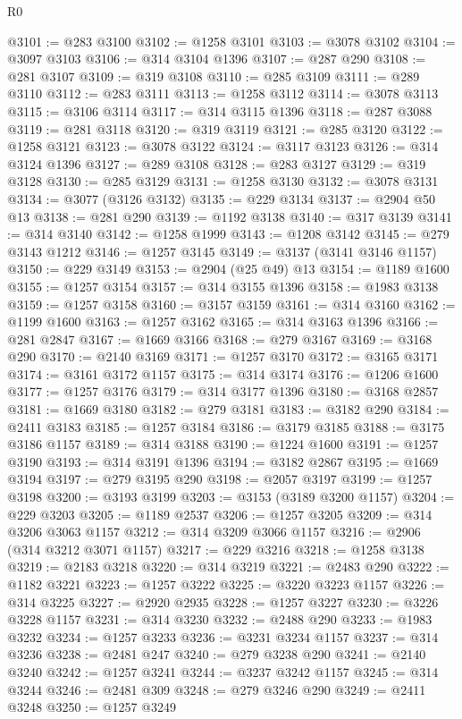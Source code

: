 \begin{lexlean}{R0}
\begin{coremodule}
@3101 := @283 @3100
@3102 := @1258 @3101
@3103 := @3078 @3102
@3104 := @3097 @3103
@3106 := @314 @3104 @1396
@3107 := @287 @290
@3108 := @281 @3107
@3109 := @319 @3108
@3110 := @285 @3109
@3111 := @289 @3110
@3112 := @283 @3111
@3113 := @1258 @3112
@3114 := @3078 @3113
@3115 := @3106 @3114
@3117 := @314 @3115 @1396
@3118 := @287 @3088
@3119 := @281 @3118
@3120 := @319 @3119
@3121 := @285 @3120
@3122 := @1258 @3121
@3123 := @3078 @3122
@3124 := @3117 @3123
@3126 := @314 @3124 @1396
@3127 := @289 @3108
@3128 := @283 @3127
@3129 := @319 @3128
@3130 := @285 @3129
@3131 := @1258 @3130
@3132 := @3078 @3131
@3134 := @3077 (@3126 @3132)
@3135 := @229 @3134
@3137 := @2904 @50 @13
@3138 := @281 @290
@3139 := @1192 @3138
@3140 := @317 @3139
@3141 := @314 @3140
@3142 := @1258 @1999
@3143 := @1208 @3142
@3145 := @279 @3143 @1212
@3146 := @1257 @3145
@3149 := @3137 (@3141 @3146 @1157)
@3150 := @229 @3149
@3153 := @2904 (@25 @49) @13
@3154 := @1189 @1600
@3155 := @1257 @3154
@3157 := @314 @3155 @1396
@3158 := @1983 @3138
@3159 := @1257 @3158
@3160 := @3157 @3159
@3161 := @314 @3160
@3162 := @1199 @1600
@3163 := @1257 @3162
@3165 := @314 @3163 @1396
@3166 := @281 @2847
@3167 := @1669 @3166
@3168 := @279 @3167
@3169 := @3168 @290
@3170 := @2140 @3169
@3171 := @1257 @3170
@3172 := @3165 @3171
@3174 := @3161 @3172 @1157
@3175 := @314 @3174
@3176 := @1206 @1600
@3177 := @1257 @3176
@3179 := @314 @3177 @1396
@3180 := @3168 @2857
@3181 := @1669 @3180
@3182 := @279 @3181
@3183 := @3182 @290
@3184 := @2411 @3183
@3185 := @1257 @3184
@3186 := @3179 @3185
@3188 := @3175 @3186 @1157
@3189 := @314 @3188
@3190 := @1224 @1600
@3191 := @1257 @3190
@3193 := @314 @3191 @1396
@3194 := @3182 @2867
@3195 := @1669 @3194
@3197 := @279 @3195 @290
@3198 := @2057 @3197
@3199 := @1257 @3198
@3200 := @3193 @3199
@3203 := @3153 (@3189 @3200 @1157)
@3204 := @229 @3203
@3205 := @1189 @2537
@3206 := @1257 @3205
@3209 := @314 @3206 @3063 @1157
@3212 := @314 @3209 @3066 @1157
@3216 := @2906 (@314 @3212 @3071 @1157)
@3217 := @229 @3216
@3218 := @1258 @3138
@3219 := @2183 @3218
@3220 := @314 @3219
@3221 := @2483 @290
@3222 := @1182 @3221
@3223 := @1257 @3222
@3225 := @3220 @3223 @1157
@3226 := @314 @3225
@3227 := @2920 @2935
@3228 := @1257 @3227
@3230 := @3226 @3228 @1157
@3231 := @314 @3230
@3232 := @2488 @290
@3233 := @1983 @3232
@3234 := @1257 @3233
@3236 := @3231 @3234 @1157
@3237 := @314 @3236
@3238 := @2481 @247
@3240 := @279 @3238 @290
@3241 := @2140 @3240
@3242 := @1257 @3241
@3244 := @3237 @3242 @1157
@3245 := @314 @3244
@3246 := @2481 @309
@3248 := @279 @3246 @290
@3249 := @2411 @3248
@3250 := @1257 @3249

\end{coremodule}
\end{lexlean}
